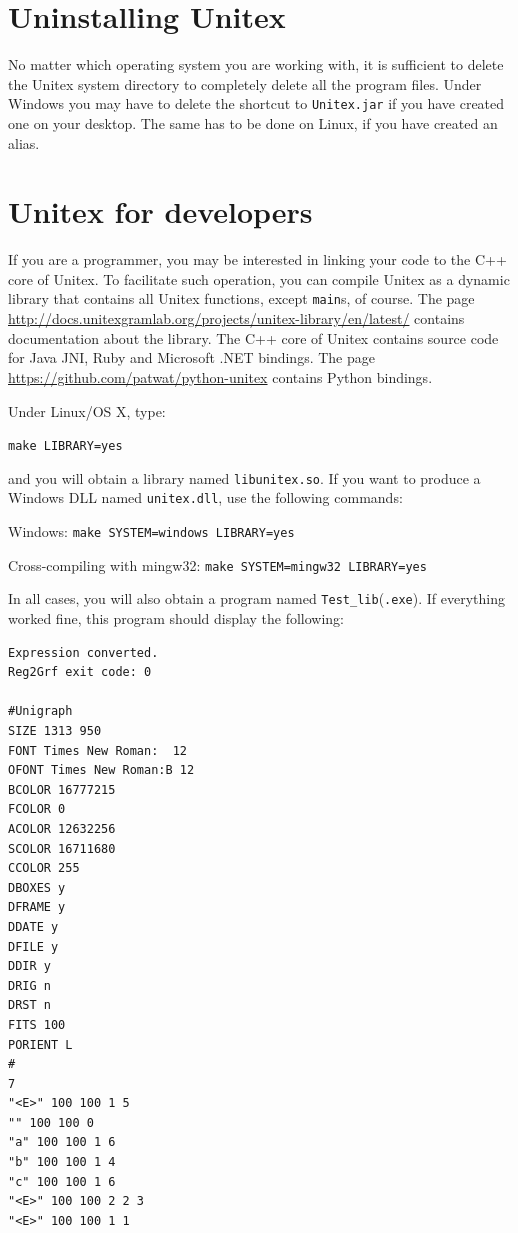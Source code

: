 \section{Uninstalling Unitex}
No matter which operating system you are working with, it is sufficient to delete 
the Unitex system directory to completely delete all the program files. Under
Windows you may have to delete the shortcut to \verb+Unitex.jar+  
if you have created one on your desktop. The same has to be done on Linux, if you have 
created an alias.


\section{Unitex for developers}
\label{section-unitex-developers}
If you are a programmer, you may be interested in linking your code to the C++ core of
Unitex. To facilitate such operation, you can compile Unitex as a
dynamic library that contains all Unitex functions, except \verb+main+s, of
course. The page \url{http://docs.unitexgramlab.org/projects/unitex-library/en/latest/} contains documentation about the library.
The C++ core of Unitex contains source code for Java JNI, Ruby and Microsoft .NET bindings. The
page \url{https://github.com/patwat/python-unitex} contains Python bindings.

\bigskip Under Linux/OS X, type:

\bigskip
\verb+make LIBRARY=yes+

\bigskip
\noindent and you will obtain a library named \verb+libunitex.so+. If you want
to produce a Windows DLL named \verb+unitex.dll+, use the following commands:

\bigskip
Windows: \verb+make SYSTEM=windows LIBRARY=yes+

Cross-compiling with mingw32: \verb+make SYSTEM=mingw32 LIBRARY=yes+

\bigskip
\noindent In all cases, you will also obtain a program named
\verb+Test_lib+(\verb+.exe+). If everything worked fine, this program should 
display the following:

\begin{verbatim}
Expression converted.
Reg2Grf exit code: 0

#Unigraph
SIZE 1313 950
FONT Times New Roman:  12
OFONT Times New Roman:B 12
BCOLOR 16777215
FCOLOR 0
ACOLOR 12632256
SCOLOR 16711680
CCOLOR 255
DBOXES y
DFRAME y
DDATE y
DFILE y
DDIR y
DRIG n
DRST n
FITS 100
PORIENT L
#
7
"<E>" 100 100 1 5
"" 100 100 0
"a" 100 100 1 6
"b" 100 100 1 4
"c" 100 100 1 6
"<E>" 100 100 2 2 3
"<E>" 100 100 1 1
\end{verbatim}
